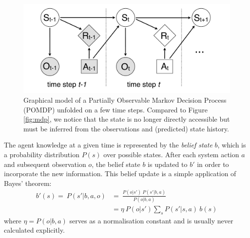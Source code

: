 \begin{figure}[h]
\centering
\includegraphics[scale=0.25]{imgs/POMDP.pdf}
\caption{Graphical model of a Partially Observable Markov Decision Process (POMDP) unfolded on a few time steps.  Compared to Figure \ref{fig:mdp}, we notice that the state is no longer directly accessible but must be inferred from the observations and (predicted) state history. }
\label{fig:pomdp}
\end{figure}

The agent knowledge at a given time is represented by the \textit{belief state} $b$, which is a probability distribution $P(s)$ over possible states.  After each system action $a$ and subsequent observation $o$, the belief state $b$ is updated to $b'$ in order to incorporate the new information.  This belief update is a simple application of Bayes' theorem: 
\begin{align}
b'(s) = \ \!P(s'|b, a,o) & = \ \frac{P(o|s') \ P(s'|b,a)}{P(o|b,a)} \\[3mm]
& = \eta \ P(o|s') \sum_{s} P(s'|s,a) \ b(s) \label{eq:update}
\end{align}
where $\eta = P(o|b,a)$ serves as a normalisation constant and is usually never calculated explicitly. 

